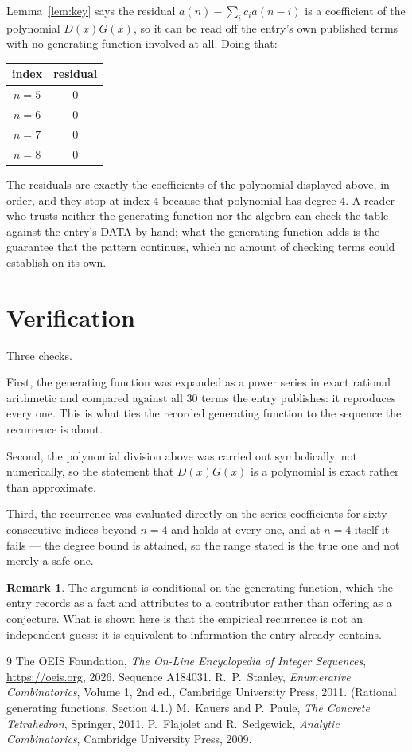 \documentclass[11pt,a4paper]{article}
\theoremstyle{plain}
\theoremstyle{definition}
\newtheorem{remark}[theorem]{Remark}
\begin{document}
Lemma~\ref{lem:key} says the residual $a(n)-\sum_ic_ia(n-i)$ is a coefficient of the
polynomial $D(x)G(x)$, so it can be read off the entry's own published terms with no
generating function involved at all. Doing that:
\begin{center}
\begin{tabular}{cc}
index & residual \\ \hline
$n=5$ & $0$ \\
$n=6$ & $0$ \\
$n=7$ & $0$ \\
$n=8$ & $0$
\end{tabular}
\end{center}
The residuals are exactly the coefficients of the polynomial displayed above, in order, and
they stop at index $4$ because that polynomial has degree $4$. A reader who trusts
neither the generating function nor the algebra can check the table against the entry's DATA
by hand; what the generating function adds is the guarantee that the pattern continues, which
no amount of checking terms could establish on its own.

\section{Verification}

Three checks.

First, the generating function was expanded as a power series in exact rational arithmetic and
compared against all $30$ terms the entry publishes: it reproduces every one. This is
what ties the recorded generating function to the sequence the recurrence is about.

Second, the polynomial division above was carried out symbolically, not numerically, so the
statement that $D(x)G(x)$ is a polynomial is exact rather than approximate.

Third, the recurrence was evaluated directly on the series coefficients for sixty consecutive
indices beyond $n=4$ and holds at every one, and at $n=4$ itself it fails --- the
degree bound is attained, so the range stated is the true one and not merely a safe one.

\begin{remark}
The argument is conditional on the generating function, which the entry records as a fact and
attributes to a contributor rather than offering as a conjecture. What is shown here is that
the empirical recurrence is not an independent guess: it is equivalent to information the
entry already contains.
\end{remark}

\begin{thebibliography}{9}
 The OEIS Foundation, \emph{The On-Line Encyclopedia of Integer
Sequences}, \url{https://oeis.org}, 2026. Sequence A184031.
 R.~P.~Stanley, \emph{Enumerative Combinatorics}, Volume 1, 2nd ed.,
Cambridge University Press, 2011. (Rational generating functions, Section 4.1.)
 M.~Kauers and P.~Paule, \emph{The Concrete Tetrahedron}, Springer, 2011.
 P.~Flajolet and R.~Sedgewick, \emph{Analytic Combinatorics}, Cambridge
University Press, 2009.
\end{thebibliography}
\end{document}
